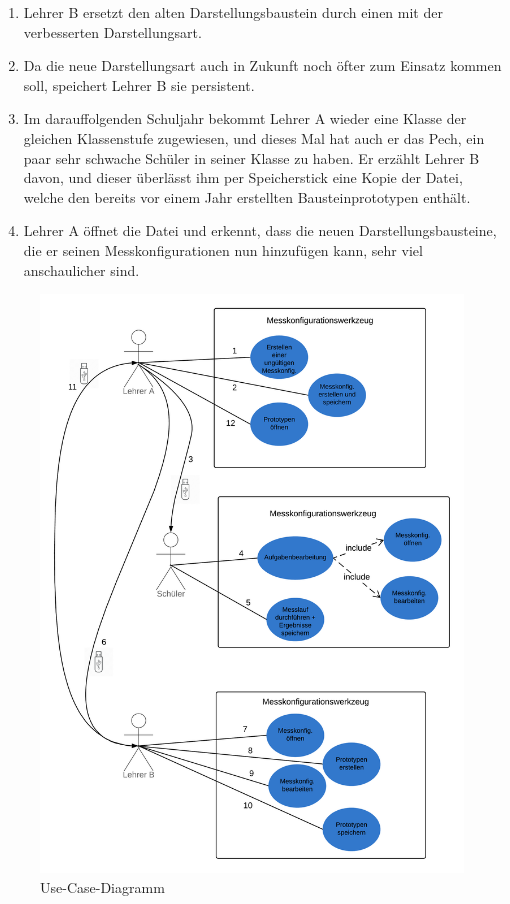 \documentclass[parskip=full]{scrartcl}
\begin{document}
\begin{enumerate}
	\item Lehrer B ersetzt den alten Darstellungsbaustein durch einen mit der verbesserten Darstellungsart. 
	
	\item Da die neue Darstellungsart auch in Zukunft noch öfter zum Einsatz kommen soll, speichert Lehrer B sie persistent. 
	
	\item Im darauffolgenden Schuljahr bekommt Lehrer A wieder eine Klasse der gleichen Klassenstufe zugewiesen, und dieses Mal hat auch er das Pech, ein paar sehr schwache Schüler in seiner Klasse zu haben. Er erzählt Lehrer B davon, und dieser überlässt ihm per Speicherstick eine Kopie der Datei, welche den bereits vor einem Jahr erstellten Bausteinprototypen enthält. 	
	
	\item Lehrer A öffnet die Datei und erkennt, dass die neuen Darstellungsbausteine, die er seinen Messkonfigurationen nun hinzufügen kann, sehr viel anschaulicher sind.
\end{enumerate}


\begin{figure}[h]
	\begin{center}
		\includegraphics[width = 12cm]{Grafik/UseCaseDiagram.png}
		\caption{Use-Case-Diagramm}
		\label{UseCaseDiagramm}
	\end{center}
\end{figure}
\end{document}
